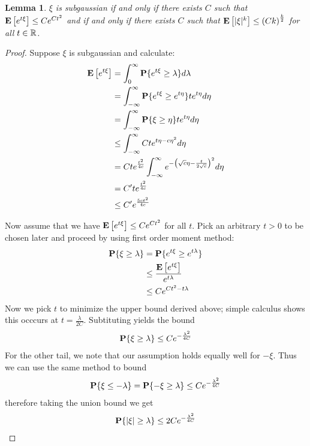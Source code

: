 \documentclass{amsart}
\newtheorem{lem}[thm]{Lemma}
\theoremstyle{remark}
\theoremstyle{definition}
\begin{document}
\begin{lem}\label{SubgaussianEquivalence}$\xi$ is subgaussian if and only if there exists $C$ such
  that $\textbf{E}\left[e^{t\xi}\right] \leq C e^{Ct^2}$ and if and only if
    there exists $C$ such that $\textbf{E}\left[|\xi|^k\right] \leq
    \left(Ck\right)^{\frac{k}{2}}$ for all $t \in \mathbb{R}$.
\end{lem}
\begin{proof}
Suppose $\xi$ is subgaussian and calculate:
\begin{align*}
\textbf{E}\left[e^{t\xi}\right] &= \int_0^\infty \textbf{P}\{e^{t\xi} \geq
    \lambda\} d\lambda \\
&= \int_{-\infty}^\infty \textbf{P}\{e^{t\xi} \geq e^{t\eta}\} t
e^{t\eta} d\eta \\
& = \int_{-\infty}^\infty \textbf{P}\{\xi \geq \eta\} t
e^{t\eta} d\eta \\
& \leq \int_{-\infty}^\infty C t
e^{t\eta - c\eta^2} d\eta  \\
& = C t e^{\frac{t^2}{4c}}\int_{-\infty}^\infty 
e^{-\left(\sqrt{c}\eta - \frac{t}{2\sqrt{c}}\right)^2} d\eta \\
&= C^\prime t e^{\frac{t^2}{4c}} \\
&\leq C^\prime e^{\frac{5c t^2}{4c}} 
\end{align*}

Now assume that we have $\textbf{E}\left[e^{t\xi}\right] \leq C e^{Ct^2}$ for
all $t$.  Pick an arbitrary $t>0$ to be
chosen later and proceed by using first order
moment method:
\begin{align*}
\textbf{P}\{\xi \geq \lambda\} &= \textbf{P}\{e^{t\xi} \geq
  e^{t\lambda}\} \\
&\leq \frac{\textbf{E}\left[e^{t\xi}\right]}{e^{t\lambda}} \\
&\leq C e^{Ct^2 - t\lambda} \\
\end{align*}
Now we pick $t$ to minimize the upper bound derived above; simple
calculus shows this occcurs at $t=\frac{\lambda}{2C}$.  Subtituting
yields the bound 
\begin{align*}
\textbf{P}\{\xi \geq \lambda\} \leq C e ^ {-\frac{\lambda^2}{4C}}
\end{align*}
For the other tail, we note that our assumption holds equally well for
$-\xi$.  Thus we can use the same method to bound 
\begin{align*}
\textbf{P}\{\xi \leq -\lambda\} = \textbf{P}\{-\xi \geq \lambda\} \leq C e ^ {-\frac{\lambda^2}{4C}}
\end{align*}
therefore taking the union bound we get
\begin{align*}
\textbf{P}\{|\xi| \geq \lambda\} \leq 2 C e ^ {-\frac{\lambda^2}{4C}}
\end{align*}


\end{proof}
\end{document}
